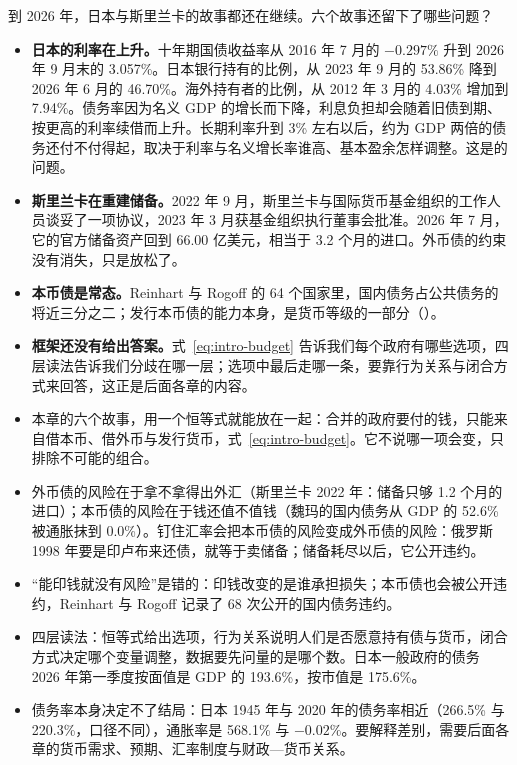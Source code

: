 到 2026 年，日本与斯里兰卡的故事都还在继续。六个故事还留下了哪些问题？
\begin{itemize}
\item \textbf{日本的利率在上升。}十年期国债收益率从 2016 年 7 月的 $-0.297\%$ 升到 2026 年 9 月末的 3.057\%\cite{mof2026}。日本银行持有的比例，从 2023 年 9 月的 53.86\% 降到 2026 年 6 月的 46.70\%。海外持有者的比例，从 2012 年 3 月的 4.03\% 增加到 7.94\%\cite{boj2026ff}。债务率因为名义 GDP 的增长而下降，利息负担却会随着旧债到期、按更高的利率续借而上升。长期利率升到 3\% 左右以后，约为 GDP 两倍的债务还付不付得起，取决于利率与名义增长率谁高、基本盈余怎样调整。这是的问题。
\item \textbf{斯里兰卡在重建储备。}2022 年 9 月，斯里兰卡与国际货币基金组织的工作人员谈妥了一项协议，2023 年 3 月获基金组织执行董事会批准\cite{cbsl2023ar}。2026 年 7 月，它的官方储备资产回到 66.00 亿美元，相当于 3.2 个月的进口\cite{cbsl2026rdt}。外币债的约束没有消失，只是放松了。
\item \textbf{本币债是常态。}Reinhart 与 Rogoff 的 64 个国家里，国内债务占公共债务的将近三分之二\cite{reinhart2008}；发行本币债的能力本身，是货币等级的一部分（）。
\item \textbf{框架还没有给出答案。}式~\eqref{eq:intro-budget} 告诉我们每个政府有哪些选项，四层读法告诉我们分歧在哪一层；选项中最后走哪一条，要靠行为关系与闭合方式来回答，这正是后面各章的内容。
\end{itemize}

\begin{takeaways}
\begin{itemize}
\item 本章的六个故事，用一个恒等式就能放在一起：合并的政府要付的钱，只能来自借本币、借外币与发行货币，式~\eqref{eq:intro-budget}。它不说哪一项会变，只排除不可能的组合。
\item 外币债的风险在于拿不拿得出外汇（斯里兰卡 2022 年：储备只够 1.2 个月的进口）；本币债的风险在于钱还值不值钱（魏玛的国内债务从 GDP 的 52.6\% 被通胀抹到 0.0\%）。钉住汇率会把本币债的风险变成外币债的风险：俄罗斯 1998 年要是印卢布来还债，就等于卖储备；储备耗尽以后，它公开违约。
\item “能印钱就没有风险”是错的：印钱改变的是谁承担损失；本币债也会被公开违约，Reinhart 与 Rogoff 记录了 68 次公开的国内债务违约。
\item 四层读法：恒等式给出选项，行为关系说明人们是否愿意持有债与货币，闭合方式决定哪个变量调整，数据要先问量的是哪个数。日本一般政府的债务 2026 年第一季度按面值是 GDP 的 193.6\%，按市值是 175.6\%。
\item 债务率本身决定不了结局：日本 1945 年与 2020 年的债务率相近（266.5\% 与 220.3\%，口径不同），通胀率是 568.1\% 与 $-0.02\%$。要解释差别，需要后面各章的货币需求、预期、汇率制度与财政—货币关系。
\end{itemize}
\end{takeaways}

